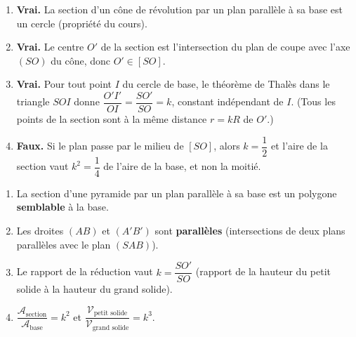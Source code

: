 \documentclass[11pt]{article}
\begin{document}
\begin{corrige}
\begin{enumerate}
    \item \textbf{Vrai.} La section d'un cône de révolution par un plan parallèle à sa base est un cercle (propriété du cours).
    \item \textbf{Vrai.} Le centre $O'$ de la section est l'intersection du plan de coupe avec l'axe $(SO)$ du cône, donc $O' \in [SO]$.
    \item \textbf{Vrai.} Pour tout point $I$ du cercle de base, le théorème de Thalès dans le triangle $SOI$ donne $\dfrac{O'I'}{OI} = \dfrac{SO'}{SO} = k$, constant indépendant de $I$. (Tous les points de la section sont à la même distance $r = kR$ de $O'$.)
    \item \textbf{Faux.} Si le plan passe par le milieu de $[SO]$, alors $k = \dfrac{1}{2}$ et l'aire de la section vaut $k^2 = \dfrac{1}{4}$ de l'aire de la base, et non la moitié.
\end{enumerate}
\end{corrige}

\begin{corrige}
\begin{enumerate}
    \item La section d'une pyramide par un plan parallèle à sa base est un polygone \textbf{semblable} à la base.
    \item Les droites $(AB)$ et $(A'B')$ sont \textbf{parallèles} (intersections de deux plans parallèles avec le plan $(SAB)$).
    \item Le rapport de la réduction vaut $k = \dfrac{SO'}{SO}$ (rapport de la hauteur du petit solide à la hauteur du grand solide).
    \item $\dfrac{\mathcal{A}_{\text{section}}}{\mathcal{A}_{\text{base}}} = k^2$ et $\dfrac{\mathcal{V}_{\text{petit solide}}}{\mathcal{V}_{\text{grand solide}}} = k^3$.
\end{enumerate}
\end{corrige}
\end{document}
